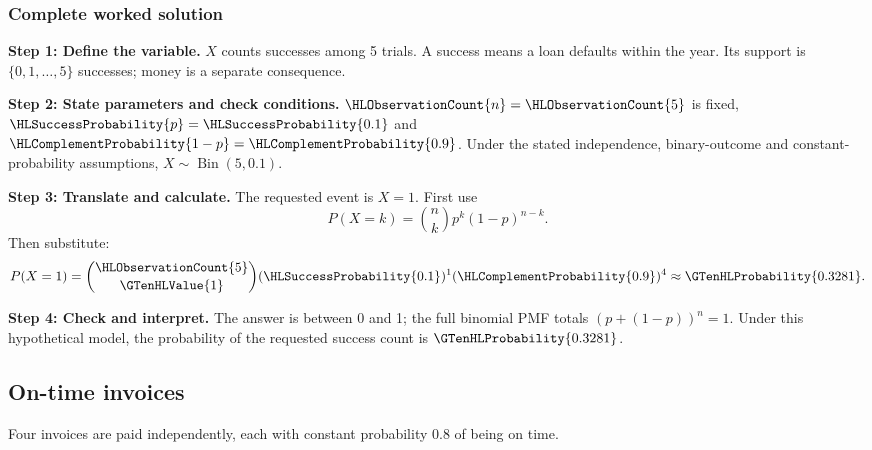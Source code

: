 \subsubsection*{Complete worked solution}\label{sol:loans}
\par\noindent\begin{minipage}{\linewidth}
\textbf{Step 1: Define the variable.} $X$ counts successes among 5 trials. A success means a loan defaults within the year. Its support is $\{0,1,\ldots,5\}$ successes; money is a separate consequence.
\end{minipage}\par\medskip
\par\noindent\begin{minipage}{\linewidth}
\textbf{Step 2: State parameters and check conditions.} $\HLObservationCount{n}=\HLObservationCount{5}$ is fixed, $\HLSuccessProbability{p}=\HLSuccessProbability{0.1}$ and $\HLComplementProbability{1-p}=\HLComplementProbability{0.9}$. Under the stated independence, binary-outcome and constant-probability assumptions, $X\sim\operatorname{Bin}(5,0.1)$.
\end{minipage}\par\medskip
\par\noindent\begin{minipage}{\linewidth}
\textbf{Step 3: Translate and calculate.} The requested event is $ X=1$. First use
\[P(X=k)=\binom nk p^k(1-p)^{n-k}.\]
Then substitute:
\[P(X=1)=\binom{\HLObservationCount{5}}{\GTenHLValue{1}}(\HLSuccessProbability{0.1})^{1}(\HLComplementProbability{0.9})^{4}\approx \GTenHLProbability{0.3281}.\]
\end{minipage}\par\medskip
\par\noindent\begin{minipage}{\linewidth}
\textbf{Step 4: Check and interpret.} The answer is between 0 and 1; the full binomial PMF totals $(p+(1-p))^n=1$. Under this hypothetical model, the probability of the requested success count is $\GTenHLProbability{0.3281}$.
\end{minipage}\par\medskip

\clearpage
\subsection{On-time invoices}\label{prob:invoices}
Four invoices are paid independently, each with constant probability 0.8 of being on time.

